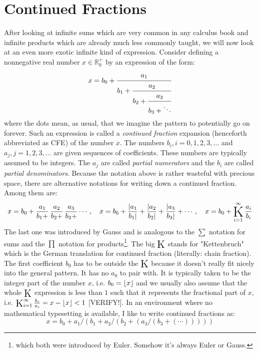 \section{Continued Fractions}
After looking at infinite sums which are very common in any calculus book and infinite products which are already much less commonly taught, we will now look at an even more exotic infinite kind of expression. Consider defining a nonnegative real number $x \in \mathbb{R}_0^+$ by an expression of the form:
\begin{equation}
\label{Eq:ContinuedFraction}
x = b_0 + \cfrac{a_1}{b_1 + \cfrac{a_2}{b_2 + \cfrac{a_3}{b_3 + \ddots }}}
\end{equation}
where the dots mean, as usual, that we imagine the pattern to potentially go on forever. Such an expression is called a \emph{continued fraction} expansion (henceforth abbreviated as CFE) of the number $x$. The numbers $b_i, i = 0,1,2,3,\ldots$ and $a_j, j = 1,2,3,\ldots$ are given sequences of coefficients. These numbers are typically assumed to be integers. The $a_j$ are called \emph{partial numerators} and the $b_i$ are called \emph{partial denominators}. Because the notation above is rather wasteful with precious space, there are alternative notations for writing down a continued fraction. Among them are:
\begin{equation}
x = b_0 + \frac{a_1}{b_1 +} \, \frac{a_2}{b_2 +} \, \frac{a_3}{b_3 +} \cdots, \quad
x = b_0 + \frac{|a_1}{b_1|} + \frac{|a_2}{b_2|} + \frac{|a_3}{b_3|} + \cdots, \quad
x = b_0 + \opK_{i=1}^{\infty} \frac{a_i}{b_i}
\end{equation}
The last one was introduced by Gauss and is analogous to the $\sum$ notation for sums and the $\prod$ notation for products\footnote{which both were introduced by Euler. Somehow it's always Euler or Gauss.}. The big $\opK$ stands for "Kettenbruch" which is the German translation for continued fraction (literally: chain fraction). The first coefficient $b_0$ has to be outside the $\opK$ because it doesn't really fit nicely into the general pattern. It has no $a_0$ to pair with. It is typically taken to be the integer part of the number $x$, i.e. $b_0 =\lfloor x\rfloor$ and we usually also assume that the whole $\opK$ expression is less than $1$ such that it represents the fractional part of $x$, i.e. $\opK_{i=1}^{\infty} \frac{b_i}{a_i} = x - \floor{x} < 1$ [VERIFY!]. In an environment where no mathematical typesetting is available, I like to write continued fractions as:
\begin{equation}
x = b_0 + a_1 / (b_1 + a_2 / (b_2 + (a_3 /  (b_3 + (\cdots))))) 
\end{equation}
